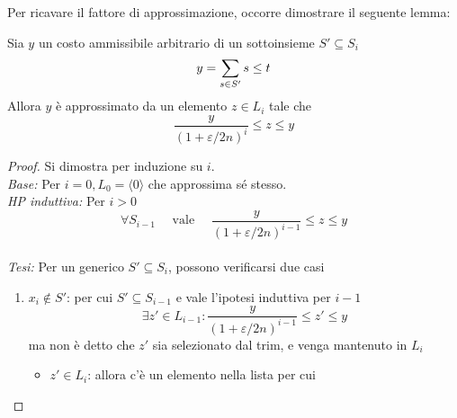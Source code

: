 Per ricavare il fattore di approssimazione, occorre dimostrare il seguente lemma:
\begin{lemma}
    \label{lem:ss_costo_approx}
    Sia $y$ un costo ammissibile arbitrario di un sottoinsieme $S' \subseteq S_i$
    \begin{equation*}
        y = \sum_{s \in S'} s \leq t \\
    \end{equation*}
    Allora $y$ è approssimato da un elemento $z \in L_i $ tale che
    \begin{equation*}
        \frac{y}{
            \left( 
            1+
            \varepsilon / 2n
            \right)^i
        } \leq z \leq y
    \end{equation*}
    \begin{proof}
        Si dimostra per induzione su $i$.
        \\
        \emph{Base:}
        Per $i=0,
        L_0 = \langle 0 \rangle 
        $ che approssima sé stesso.
        \\
        \emph{HP induttiva:}
        Per $i>0$
        \begin{equation*}
            \forall S_{i-1} \quad \text{ vale } 
            \quad
            \frac{y}{
                \left( 
                1+
                \varepsilon / 2n
                \right)^{i-1}
            } \leq z \leq y
        \end{equation*}
        \\
        \emph{Tesi:}
        Per un generico $S' \subseteq S_i$, possono verificarsi due casi
        \begin{enumerate}
            \item $x_i \notin S'$: per cui $S' \subseteq S_{i-1}$ e vale l'ipotesi induttiva per $i-1$
                \begin{equation*}
                    \exists z' \in L_{i-1} :
                    \frac{y}{
                        \left( 
                        1+
                        \varepsilon / 2n
                        \right)^{i-1}
                    } \leq z' \leq y
                \end{equation*}
                ma non è detto che $z'$ sia selezionato dal trim, e venga mantenuto in $L_i$
                \begin{itemize}
                    \item $z' \in L_i$: allora c'è un elemento nella lista per cui

\end{itemize}
\end{enumerate}
\end{proof}
\end{lemma}
